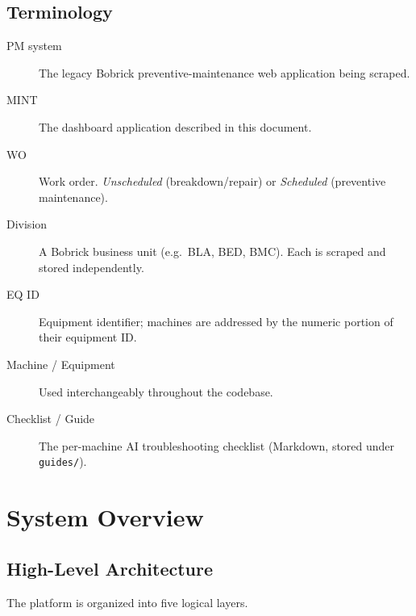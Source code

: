 \documentclass[11pt,a4paper]{article}
\newcommand{\code}[1]{\texttt{#1}}
\begin{document}
\subsection{Terminology}
\begin{description}
    \item[PM system] The legacy Bobrick preventive-maintenance web
          application being scraped.
    \item[MINT] The dashboard application described in this document.
    \item[WO] Work order. \emph{Unscheduled} (breakdown/repair) or
          \emph{Scheduled} (preventive maintenance).
    \item[Division] A Bobrick business unit (e.g.\ BLA, BED, BMC). Each is
          scraped and stored independently.
    \item[EQ ID] Equipment identifier; machines are addressed by the numeric
          portion of their equipment ID.
    \item[Machine / Equipment] Used interchangeably throughout the codebase.
    \item[Checklist / Guide] The per-machine AI troubleshooting checklist
          (Markdown, stored under \code{guides/}).
\end{description}

\section{System Overview}

\subsection{High-Level Architecture}
The platform is organized into five logical layers.
\end{document}
